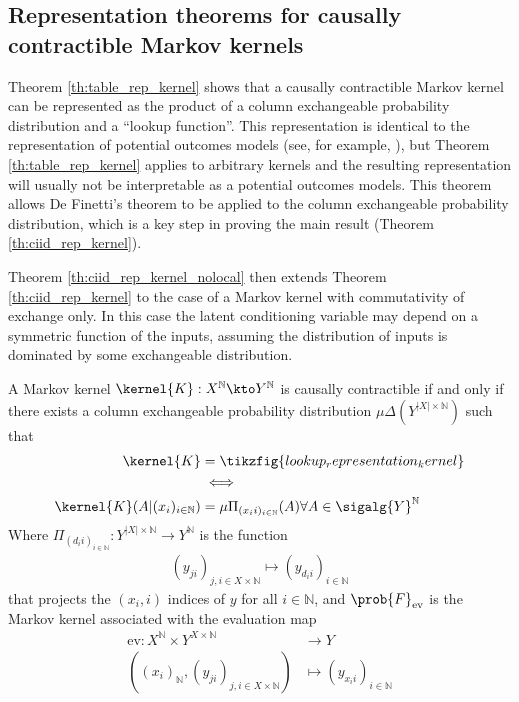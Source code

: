 \subsection[Representation theorems]{Representation theorems for causally contractible Markov kernels}\label{sec:rep_theorem}

Theorem \ref{th:table_rep_kernel} shows that a causally contractible Markov kernel can be represented as the product of a column exchangeable probability distribution and a ``lookup function''. This representation is identical to the representation of potential outcomes models (see, for example, \citet{rubin_causal_2005}), but Theorem \ref{th:table_rep_kernel} applies to arbitrary kernels and the resulting representation will usually not be interpretable as a potential outcomes models. This theorem allows De Finetti's theorem to be applied to the column exchangeable probability distribution, which is a key step in proving the main result (Theorem \ref{th:ciid_rep_kernel}).

Theorem \ref{th:ciid_rep_kernel_nolocal} then extends Theorem \ref{th:ciid_rep_kernel} to the case of a Markov kernel with commutativity of exchange only. In this case the latent conditioning variable may depend on a symmetric function of the inputs, assuming the distribution of inputs is dominated by some exchangeable distribution.

\begin{theorem}\label{th:table_rep_kernel}
A Markov kernel $\kernel{K}:X^{\mathbb{N}}\kto Y^{\mathbb{N}}$ is causally contractible if and only if there exists a column exchangeable probability distribution $\mu \Delta(Y^{|X|\times \mathbb{N}})$ such that
\begin{align}
    \kernel{K} &= \tikzfig{lookup_representation_kernel}\label{eq:lup_rep_kernel}\\
    &\iff\\
    \kernel{K}(A|(x_i)_{i\in \mathbb{N}}) &= \mu \Pi_{(x_i i)_{i\in\mathbb{N}}}(A)\forall A\in \sigalg{Y}^{\mathbb{N}}
\end{align}
Where $\Pi_{(d_i i)_{i\in\mathbb{N}}}:Y^{|X|\times \mathbb{N}}\to Y^{\mathbb{N}}$ is the function 
\begin{align}
    (y_{j i})_{j,i \in X\times  \mathbb{N}}\mapsto (y_{d_i i})_{i\in \mathbb{N}}
\end{align}
that projects the $(x_i,i)$ indices of $y$ for all $i\in \mathbb{N}$, and $\prob{F}_{\text{ev}}$ is the Markov kernel associated with the evaluation map
\begin{align}
    \text{ev}:X^\mathbb{N}\times Y^{X\times \mathbb{N}}&\to Y\\
    ((x_i)_\mathbb{N},(y_{ji})_{j,i\in X\times \mathbb{N}})&\mapsto (y_{x_i i})_{i\in \mathbb{N}}
\end{align}
\end{theorem}

